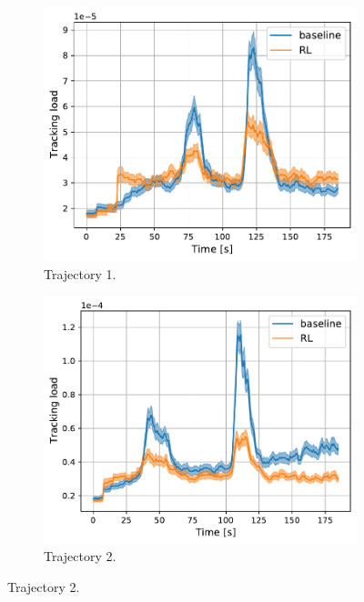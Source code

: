 \documentclass[english, 12pt, a4paper, elec, utf8, a-1b, online]{aaltothesis}
\begin{document}
\begin{figure}
    \centering
    \begin{subfigure}[b]{0.45\textwidth}
        \centering
        \includegraphics[width=\linewidth]{figures/benchmark/Simulations/tracking_load_0.pdf}
        \caption{Trajectory 1.}
        \label{fig:TL_T1}
    \end{subfigure}
    \hfill
    \begin{subfigure}[b]{0.45\textwidth}
        \centering
        \includegraphics[width=\linewidth]{figures/benchmark/Simulations/tracking_load_1.pdf}
        \caption{Trajectory 2.}

\end{subfigure}
\end{figure}
\end{document}
